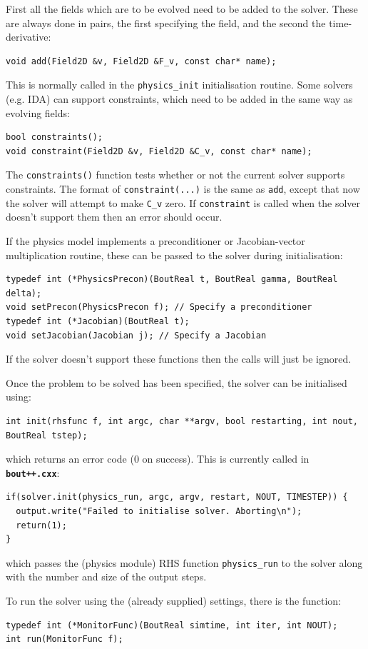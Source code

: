 \documentclass[12pt]{article}
\newcommand{\code}[1]{\texttt{#1}}
\newcommand{\file}[1]{\texttt{\bf #1}}
\begin{document}
First all the fields which are to be evolved need to be added
to the solver. These are always done in pairs, the first
specifying the field, and the second the time-derivative:
\begin{lstlisting}
void add(Field2D &v, Field2D &F_v, const char* name);
\end{lstlisting}
This is normally called in the \code{physics\_init} initialisation routine.
Some solvers (e.g. IDA) can support constraints, which need to be added
in the same way as evolving fields:
\begin{lstlisting}
bool constraints();
void constraint(Field2D &v, Field2D &C_v, const char* name);
\end{lstlisting}
The \code{constraints()} function tests whether or not the current
solver supports constraints. The format of \code{constraint(...)} is
the same as \code{add}, except that now the solver will attempt to make
\code{C\_v} zero. If \code{constraint} is called when the solver doesn't
support them then an error should occur.

If the physics model implements a preconditioner or Jacobian-vector
multiplication routine, these can be passed to the solver during
initialisation:
\begin{lstlisting}
typedef int (*PhysicsPrecon)(BoutReal t, BoutReal gamma, BoutReal delta);
void setPrecon(PhysicsPrecon f); // Specify a preconditioner
typedef int (*Jacobian)(BoutReal t);
void setJacobian(Jacobian j); // Specify a Jacobian
\end{lstlisting}
If the solver doesn't support these functions then the calls 
will just be ignored.

Once the problem to be solved has been specified, the solver can be
initialised using:
\begin{lstlisting}
int init(rhsfunc f, int argc, char **argv, bool restarting, int nout, BoutReal tstep);
\end{lstlisting}
which returns an error code (0 on success). This is currently
called in \file{bout++.cxx}:
\begin{lstlisting}
if(solver.init(physics_run, argc, argv, restart, NOUT, TIMESTEP)) {
  output.write("Failed to initialise solver. Aborting\n");
  return(1);
}
\end{lstlisting}
which passes the (physics module) RHS function \code{physics\_run}
to the solver along with the number and size of the output steps.

To run the solver using the (already supplied) settings, there is
the function:
\begin{lstlisting}
typedef int (*MonitorFunc)(BoutReal simtime, int iter, int NOUT);
int run(MonitorFunc f);
\end{lstlisting}
\end{document}
